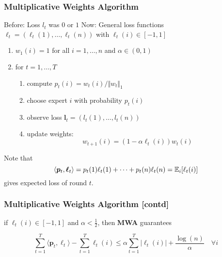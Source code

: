 \documentclass{beamer}
\begin{document}
\begin{frame}
  \frametitle{Multiplicative Weights Algorithm}
  Before: Loss $l_t$ was $0$ or $1$
  Now: General loss functions $\bm{\ell}_t= (\ell_t(1), \dots, \ell_t(n))$ with $\ell_t(i) \in [-1, 1]$
  \begin{enumerate}
    \item $w_1(i) = 1$ for all $i = 1, \dots, n$ and $\alpha \in (0, 1)$
    \item for $t=1, \dots, T$
      \begin{enumerate}
        \item compute $p_t(i) = w_t(i)/\Vert w_t \Vert_1$
        \item choose expert $i$ with probability $p_t(i)$
        \item observe loss $\bm{l}_t= (l_t(1), \dots, l_t(n))$
        \item update weights:
          \begin{equation}
            w_{t+1}(i) = (1-\alpha \ell_t(i)) w_t(i)
          \end{equation}
      \end{enumerate}
  \end{enumerate}

  Note that
  \begin{equation}
    \langle \bm{p}_t, \bm{\ell}_t \rangle = p_t(1)\ell_t(1) + \cdots + p_t(n)\ell_t(n) = \mathbb{E}_i[\ell_t(i)]
  \end{equation}
  gives expected loss of round $t$.
\end{frame}

\begin{frame}
  \frametitle{Multiplicative Weights Algorithm [contd]}

  \begin{theorem}
    if $\ell_t(i) \in [-1, 1]$ and $\alpha < \frac12$, then \textbf{MWA} guarantees

    \begin{equation}
      \sum_{t=1}^{T} \langle \bm{p}_t, \bm{\ell}_t \rangle  - \sum_{t=1}^{T} \ell_t(i) \le \alpha \sum_{t=1}^{T} \vert \ell_t(i) \vert + \frac{\log(n)}{\alpha} \quad \forall i
    \end{equation}

  \end{theorem}

\end{frame}
\end{document}
